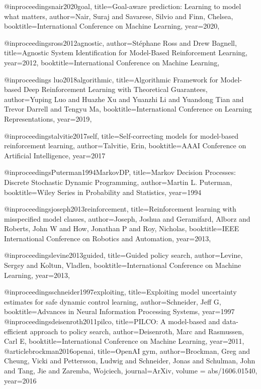 @inproceedings{nair2020goal,
  title={Goal-aware prediction: Learning to model what matters},
  author={Nair, Suraj and Savarese, Silvio and Finn, Chelsea},
  booktitle={International Conference on Machine Learning},
  year={2020},
}


@inproceedings{ross2012agnostic,
  author={Stéphane Ross and Drew Bagnell},
  title={Agnostic System Identification for Model-Based Reinforcement Learning},
  year={2012},
  booktitle={International Conference on Machine Learning},
}

@inproceedings{
luo2018algorithmic,
title={Algorithmic Framework for Model-based Deep Reinforcement Learning with Theoretical Guarantees},
author={Yuping Luo and Huazhe Xu and Yuanzhi Li and Yuandong Tian and Trevor Darrell and Tengyu Ma},
booktitle={International Conference on Learning Representations},
year={2019},
}

@inproceedings{talvitie2017self,
  title={Self-correcting models for model-based reinforcement learning},
  author={Talvitie, Erin},
  booktitle={AAAI Conference on Artificial Intelligence},
  year={2017}
}


@inproceedings{Puterman1994MarkovDP,
  title={Markov Decision Processes: Discrete Stochastic Dynamic Programming},
  author={Martin L. Puterman},
  booktitle={Wiley Series in Probability and Statistics},
  year={1994}
}

@inproceedings{joseph2013reinforcement,
  title={Reinforcement learning with misspecified model classes},
  author={Joseph, Joshua and Geramifard, Alborz and Roberts, John W and How, Jonathan P and Roy, Nicholas},
  booktitle={IEEE International Conference on Robotics and Automation},
  year={2013},
}

@inproceedings{levine2013guided,
  title={Guided policy search},
  author={Levine, Sergey and Koltun, Vladlen},
  booktitle={International Conference on Machine Learning},
  year={2013},
}

@inproceedings{schneider1997exploiting,
  title={Exploiting model uncertainty estimates for safe dynamic control learning},
  author={Schneider, Jeff G},
  booktitle={Advances in Neural Information Processing Systems},
  year={1997}
}
@inproceedings{deisenroth2011pilco,
  title={PILCO: A model-based and data-efficient approach to policy search},
  author={Deisenroth, Marc and Rasmussen, Carl E},
  booktitle={International Conference on Machine Learning},
  year={2011},
}
 @article{brockman2016openai,
  title={OpenAI gym},
  author={Brockman, Greg and Cheung, Vicki and Pettersson, Ludwig and Schneider, Jonas and Schulman, John and Tang, Jie and Zaremba, Wojciech},
  journal={ArXiv},
  volume = {abs/1606.01540},
  year={2016}
} 

